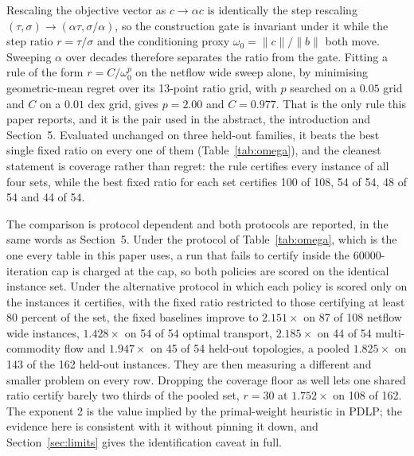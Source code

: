 Rescaling the objective vector as $c \to \alpha c$ is identically the step
rescaling $(\tau, \sigma) \to (\alpha \tau, \sigma / \alpha)$, so the
construction gate is invariant under it while the step ratio $r = \tau / \sigma$
and the conditioning proxy $\omega_0 = \lVert c \rVert / \lVert b \rVert$ both
move. Sweeping $\alpha$ over decades therefore separates the ratio from the
gate. Fitting a rule of the form $r = C / \omega_0^{p}$ on the netflow wide
sweep alone, by minimising geometric-mean regret over its 13-point ratio grid,
with $p$ searched on a $0.05$ grid and $C$ on a $0.01$ dex grid, gives
$p = 2.00$ and $C = 0.977$. That is the only rule this paper reports, and it is
the pair used in the abstract, the introduction and Section~5. Evaluated
unchanged on three held-out families, it beats the best single fixed ratio on
every one of them (Table~\ref{tab:omega}), and the cleanest statement is
coverage rather than regret: the rule certifies every instance of all four sets,
while the best fixed ratio for each set certifies 100 of 108, 54 of 54, 48 of 54
and 44 of 54.

The comparison is protocol dependent and both protocols are reported, in the
same words as Section~5. Under the protocol of Table~\ref{tab:omega}, which is
the one every table in this paper uses, a run that fails to certify inside the
60000-iteration cap is charged at the cap, so both policies are scored on the
identical instance set. Under the alternative protocol in which each policy is
scored only on the instances it certifies, with the fixed ratio restricted to
those certifying at least 80 percent of the set, the fixed baselines improve to
$2.151\times$ on 87 of 108 netflow wide instances, $1.428\times$ on 54 of 54
optimal transport, $2.185\times$ on 44 of 54 multi-commodity flow and
$1.947\times$ on 45 of 54 held-out topologies, a pooled $1.825\times$ on 143 of
the 162 held-out instances. They are then measuring a different and smaller
problem on every row. Dropping the coverage floor as well lets one shared ratio
certify barely two thirds of the pooled set, $r = 30$ at $1.752\times$ on 108 of
162. The exponent 2 is the value implied by the primal-weight heuristic in PDLP;
the evidence here is consistent with it without pinning it down, and
Section~\ref{sec:limits} gives the identification caveat in full.

